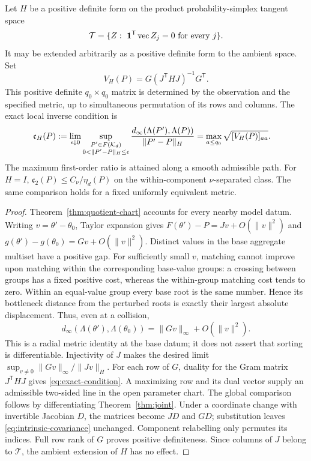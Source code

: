 \begin{theorem}\label{thm:exact-condition}
Let $H$ be a positive definite form on the product probability-simplex
tangent space
\[
 \mathcal T=\{Z:\ \mathbf 1^{\mathsf T}\operatorname{vec}Z_j=0
                                      \text{ for every }j\}.
\]
It may be extended arbitrarily as a positive definite form to the
ambient space. Set
\begin{equation}\label{eq:intrinsic-covariance}
 V_H(P)=G(J^{\mathsf T}HJ)^{-1}G^{\mathsf T}.
\end{equation}
This positive definite $q_0\times q_0$ matrix is determined by the
observation and the specified metric, up to simultaneous permutation
of its rows and columns. The exact local inverse condition is
\begin{align}
 \mathfrak c_H(P)
 &:=\lim_{\epsilon\downarrow0}\sup_{\substack{P'\in F(\mathcal K_d)\\
                     0<\|P'-P\|_H\le\epsilon}}
 \frac{d_\infty(\Lambda(P'),\Lambda(P))}{\|P'-P\|_H}
   =\max_{a\le q_0}\sqrt{[V_H(P)]_{aa}}.       \label{eq:exact-condition}
\end{align}
The maximum first-order ratio is attained along a smooth admissible
path. For $H=I$, $\mathfrak c_2(P)\le C_\nu/\eta_d(P)$ on the
within-component $\nu$-separated class. The same comparison holds for
a fixed uniformly equivalent metric.
\end{theorem}
\begin{proof}
Theorem~\ref{thm:quotient-chart} accounts for every nearby model datum.
Writing $v=\theta'-\theta_0$, Taylor expansion gives
$F(\theta')-P=Jv+O(\|v\|^2)$ and
$g(\theta')-g(\theta_0)=Gv+O(\|v\|^2)$.
Distinct values in the base aggregate multiset have a positive gap.
For sufficiently small $v$, matching cannot improve upon matching
within the corresponding base-value groups: a crossing between groups
has a fixed positive cost, whereas the within-group matching cost
tends to zero. Within an equal-value group every base root is the same
number. Hence its bottleneck distance from the perturbed roots is
exactly their largest absolute displacement. Thus, even at a collision,
\[
 d_\infty(\Lambda(\theta'),\Lambda(\theta_0))
       =\|Gv\|_\infty+O(\|v\|^2).
\]
This is a radial metric identity at the base datum; it does not assert
that sorting is differentiable. Injectivity of $J$ makes the desired
limit $\sup_{v\ne0}\|Gv\|_\infty/\|Jv\|_H$.
For each row of $G$, duality for the Gram matrix $J^{\mathsf T}HJ$
gives \eqref{eq:exact-condition}. A maximizing row and its dual vector
supply an admissible two-sided line in the open parameter chart.
The global comparison follows by differentiating
Theorem~\ref{thm:joint}. Under a coordinate change with invertible
Jacobian $D$, the matrices become $JD$ and $GD$; substitution leaves
\eqref{eq:intrinsic-covariance} unchanged. Component relabelling only
permutes its indices. Full row rank of $G$ proves positive definiteness.
Since columns of $J$ belong to $\mathcal T$, the ambient extension of
$H$ has no effect.
\end{proof}

